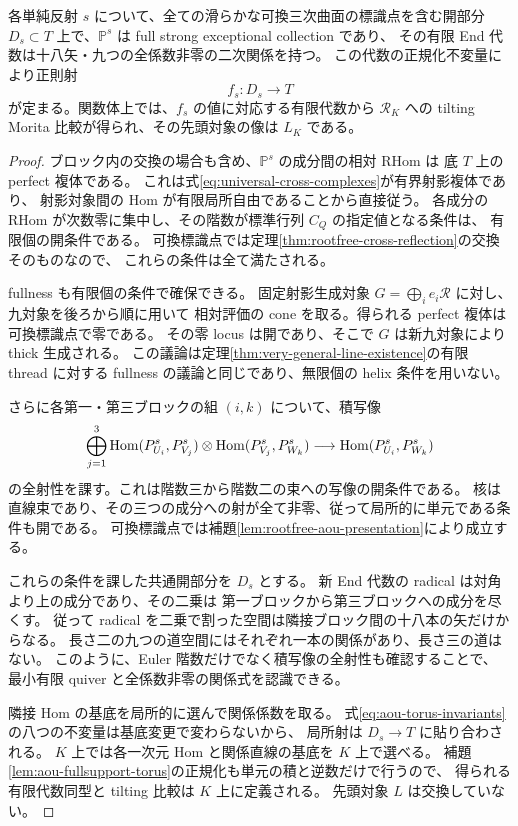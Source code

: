 \begin{lemma}
\label{lem:weyl-cross-finite-open}
各単純反射 $s$ について、全ての滑らかな可換三次曲面の標識点を含む開部分
$D_s\subset T$ 上で、$\mathbb P^s$ は full strong exceptional collection であり、
その有限 End 代数は十八矢・九つの全係数非零の二次関係を持つ。
この代数の正規化不変量により正則射
\[
 f_s:D_s\longrightarrow T
\]
が定まる。関数体上では、$f_s$ の値に対応する有限代数から
$\mathscr R_K$ への tilting Morita 比較が得られ、その先頭対象の像は $L_K$ である。
\end{lemma}
\begin{proof}
ブロック内の交換の場合も含め、$\mathbb P^s$ の成分間の相対 RHom は
底 $T$ 上の perfect 複体である。
これは式\eqref{eq:universal-cross-complexes}が有界射影複体であり、
射影対象間の Hom が有限局所自由であることから直接従う。
各成分の RHom が次数零に集中し、その階数が標準行列 $C_Q$ の指定値となる条件は、
有限個の開条件である\cite[Tag 0BDK]{Stacks}。
可換標識点では定理\ref{thm:rootfree-cross-reflection}の交換そのものなので、
これらの条件は全て満たされる。

fullness も有限個の条件で確保できる。
固定射影生成対象 $G=\bigoplus_i e_i\mathscr R$ に対し、九対象を後ろから順に用いて
相対評価の cone を取る。得られる perfect 複体は可換標識点で零である。
その零 locus は開であり、そこで $G$ は新九対象により thick 生成される。
この議論は定理\ref{thm:very-general-line-existence}の有限 thread に対する
fullness の議論と同じであり、無限個の helix 条件を用いない。

さらに各第一・第三ブロックの組 $(i,k)$ について、積写像
\[
 \bigoplus_{j=1}^3
 \operatorname{Hom}(P^s_{U_i},P^s_{V_j})\otimes
 \operatorname{Hom}(P^s_{V_j},P^s_{W_k})
 \longrightarrow \operatorname{Hom}(P^s_{U_i},P^s_{W_k})
\]
の全射性を課す。これは階数三から階数二の束への写像の開条件である。
核は直線束であり、その三つの成分への射が全て非零、従って局所的に単元である条件も開である。
可換標識点では補題\ref{lem:rootfree-aou-presentation}により成立する。

これらの条件を課した共通開部分を $D_s$ とする。
新 End 代数の radical は対角より上の成分であり、その二乗は
第一ブロックから第三ブロックへの成分を尽くす。
従って radical を二乗で割った空間は隣接ブロック間の十八本の矢だけからなる。
長さ二の九つの道空間にはそれぞれ一本の関係があり、長さ三の道はない。
このように、Euler 階数だけでなく積写像の全射性も確認することで、
最小有限 quiver と全係数非零の関係式を認識できる。

隣接 Hom の基底を局所的に選んで関係係数を取る。
式\eqref{eq:aou-torus-invariants}の八つの不変量は基底変更で変わらないから、
局所射は $D_s\to T$ に貼り合わされる。
$K$ 上では各一次元 Hom と関係直線の基底を $K$ 上で選べる。
補題\ref{lem:aou-fullsupport-torus}の正規化も単元の積と逆数だけで行うので、
得られる有限代数同型と tilting 比較は $K$ 上に定義される。
先頭対象 $L$ は交換していない。
\end{proof}

